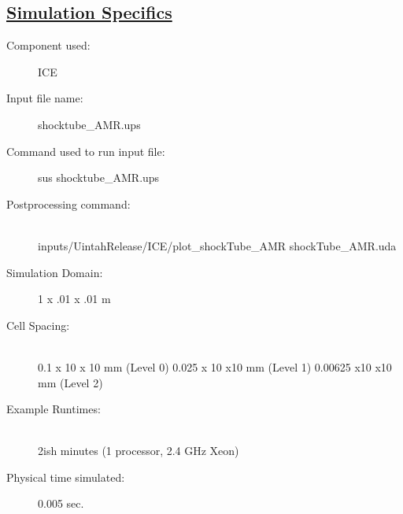 \documentclass[fleqn]{article}
\begin{document}
\subsection*{\underline{Simulation Specifics}}
\begin{description} 
\item [Component used:] \hfill ICE
\item [Input file name:] \hfill shocktube\_AMR.ups
\item [Command used to run input file:]\hfill sus shocktube\_AMR.ups
\item [Postprocessing command:]\hfill \\
inputs/UintahRelease/ICE/plot\_shockTube\_AMR shockTube\_AMR.uda

\item [Simulation Domain:]\hfill    1 x .01 x .01 m
\item [Cell Spacing:]\hfill \\ 
0.1 x 10 x 10 mm (Level 0)
0.025 x 10 x10 mm (Level 1)
0.00625 x10 x10 mm (Level 2)


\item [Example Runtimes:] \hfill \\
 2ish minutes   (1 processor, 2.4 GHz Xeon)

\item [Physical time simulated:] \hfill 0.005 sec.

\end{description}
\end{document}
